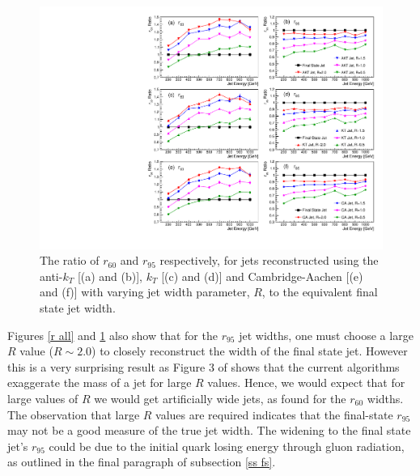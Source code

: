 \documentclass[a4paper,11pt, onecolumn]{article}
\begin{document}
  \begin{figure}[!htb]
    \begin{center}
      \includegraphics[width = \textwidth]{divide_all}
      \caption{The ratio of $r_{60}$ and $r_{95}$ respectively, for jets reconstructed using the anti-$k_{T}$ [(a) and (b)], 
               $k_{T}$ [(c) and (d)] and Cambridge-Aachen [(e) and (f)] with 
               varying jet width parameter, $R$, to the equivalent final state jet width.}
      \label{divide all}
    \end{center}
    \vspace{-0.4cm}
  \end{figure}
  
  Figures \ref{r all} and \ref{divide all} also show that for the $r_{95}$ jet widths, one must choose a large $R$ value ($R \sim 2.0$) to closely reconstruct the 
  width of the final state jet. However this is a very surprising result as Figure 3 of \cite{sc} shows that the current algorithms exaggerate the mass of 
  a jet for large $R$ values. Hence, we would expect that for large values of $R$ we would get artificially wide jets, as found for the $r_{60}$ widths.
  The observation that large $R$ values are required indicates that the final-state $r_{95}$ may not be a good measure of the true jet width. The widening to the 
  final state jet's $r_{95}$ could be due to the initial quark losing energy through gluon radiation, as outlined in the final paragraph of subsection \ref{ss fs}. \\
\end{document}
